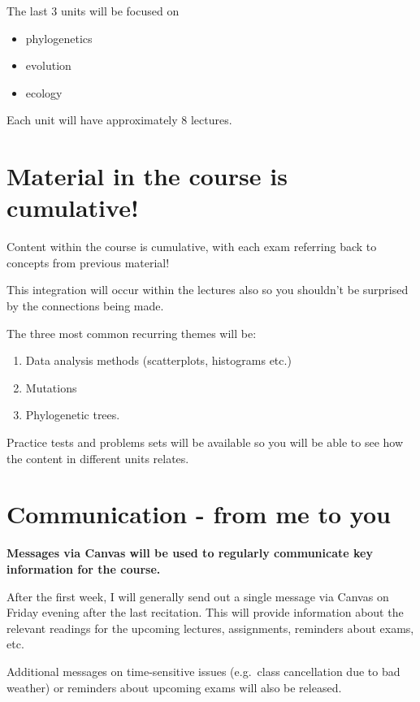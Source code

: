 \documentclass[
]{book}
\providecommand{\tightlist}{%
  \setlength{\itemsep}{0pt}\setlength{\parskip}{0pt}}
\begin{document}
The last 3 units will be focused on

\begin{itemize}
\tightlist
\item
  phylogenetics
\item
  evolution
\item
  ecology
\end{itemize}

Each unit will have approximately 8 lectures.

\hypertarget{material-in-the-course-is-cumulative}{%
\chapter{Material in the course is cumulative!}\label{material-in-the-course-is-cumulative}}

Content within the course is cumulative, with each exam referring back to concepts from previous material!

This integration will occur within the lectures also so you shouldn't be surprised by the connections being made.

The three most common recurring themes will be:

\begin{enumerate}
\def\labelenumi{\arabic{enumi}.}
\tightlist
\item
  Data analysis methods (scatterplots, histograms etc.)
\item
  Mutations
\item
  Phylogenetic trees.
\end{enumerate}

Practice tests and problems sets will be available so you will be able to see how the content in different units relates.

\hypertarget{communication---from-me-to-you}{%
\chapter{Communication - from me to you}\label{communication---from-me-to-you}}

\textbf{Messages via Canvas will be used to regularly communicate key information for the course.}

After the first week, I will generally send out a single message via Canvas on Friday evening after the last recitation. This will provide information about the relevant readings for the upcoming lectures, assignments, reminders about exams, etc.

Additional messages on time-sensitive issues (e.g.~class cancellation due to bad weather) or reminders about upcoming exams will also be released.
\end{document}
